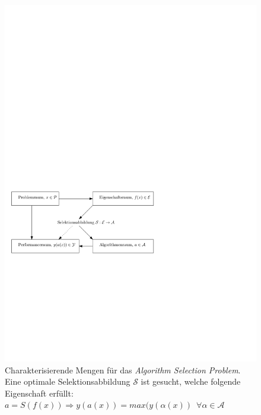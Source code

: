 \begin{figure}[h]
\centering
\includegraphics{asp.pdf}
\caption[Algorithm Selection Problem]{Charakterisierende Mengen für das \textit{Algorithm Selection Problem}. Eine optimale Selektionsabbildung $\mathcal{S}$ ist gesucht, welche folgende Eigenschaft erfüllt: $a = S(f(x)) \Rightarrow y(a(x)) = max(y(\alpha (x)) $~$ \forall \alpha \in \mathcal{A}$}
\label{asp}
\end{figure}

